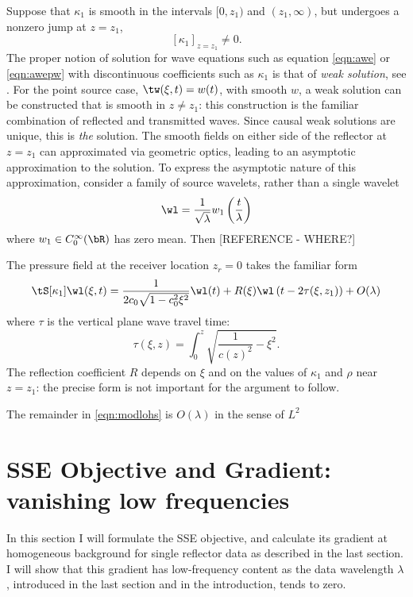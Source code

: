 Suppose that $\kappa_1$ is smooth in the intervals $[0,z_1)$ and
$(z_1,\infty)$, but undergoes a nonzero jump at $z=z_1$, 
\[
[\kappa_1]_{z=z_1} \ne 0.
\]
The proper notion of solution for wave equations such as equation
\ref{eqn:awe} or \ref{eqn:awepw} with discontinuous coefficients such
as $\kappa_1$ is that of {\em weak solution}, see
\cite{BlazekStolkSymes:13}. For the point source case, $\tw(\xi,t) =
w(t)$, with smooth $w$, a weak solution can be constructed that is
smooth in $z \ne z_1$: this construction is the familiar combination
of reflected and transmitted waves. Since causal weak solutions are
unique, this is {\em the} solution. The smooth fields on either side
of the reflector at $z=z_1$ can approximated via geometric optics,
leading to an asymptotic
approximation to the solution. To express the asymptotic nature of
this approximation, consider a family of source wavelets, rather than
a single wavelet
\[
\wl = \frac{1}{\sqrt{\lambda}}w_1\left(\frac{t}{\lambda}\right)
\]
where $w_1\in C_0^{\infty}(\bR)$ has zero mean. Then [REFERENCE - WHERE?]

The pressure field at the receiver 
location $z_r=0$ takes the familiar form  
\begin{equation}
\label{eqn:modlohs}
\tS[\kappa_1]\wl(\xi,t) = \frac{1}{2c_0\sqrt{1-c_0^2\xi^2}}\wl(t) +
R(\xi)\wl\left(t-2\tau(\xi,z_1)\right) + O(\lambda)
\end{equation}
where $\tau$ is the vertical plane wave travel time:
\begin{equation}
\label{eqn:pwtt}
\tau(\xi,z) = \int_0^{z} \sqrt{\frac{1}{c(z)^2}-\xi^2}.
\end{equation}
The reflection coefficient $R$ depends on $\xi$ and on
the values of $\kappa_1$ and $\rho$ near $z=z_1$: the precise form is not
important for the argument to follow.

The remainder in \ref{eqn:modlohs} is $O(\lambda)$ in the sense of
$L^2$





\section{SSE Objective and Gradient: vanishing low frequencies}
In this section I will formulate the SSE objective, and calculate its
gradient at homogeneous background for single reflector data as
described in the last section. I will show that this gradient has
low-frequency content as the data wavelength $\lambda$, introduced in
the last section and in the introduction, tends to zero. 

